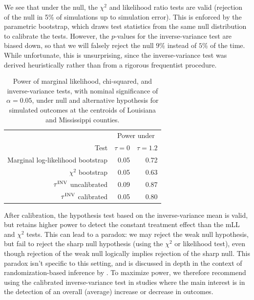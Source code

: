 	We see that under the null, the \(\chi^2\) and likelihood ratio tests are valid (rejection of the null in 5\% of simulations up to simulation error).
This is enforced by the parametric bootstrap, which draws test statistics from the same null distribution to calibrate the tests.
However, the \(p\)-values for the inverse-variance test are biased down, so that we will falsely reject the null \(9\%\) instead of \(5\%\) of the time.
While unfortunate, this is unsurprising, since the inverse-variance test was derived heuristically rather than from a rigorous frequentist procedure.

\begin{table}
    \centering
    \bgroup
    \def\arraystretch{1.1}%
    \centering
    \begin{tabular}{rrr}
        \hline
        & \multicolumn{2}{c}{Power under} \\
        Test & \(\tau=0\) & \(\tau=1.2\) \\
        \hline
	    Marginal log-likelihood bootstrap & 0.05 & 0.72 \\
	    \(\chi^2\) bootstrap & 0.05 & 0.63 \\
	    \(\tau^{\mathrm{INV}}\) uncalibrated & 0.09 & 0.87 \\
	    \(\tau^{\mathrm{INV}}\) calibrated & 0.05 & 0.80 \\
        \hline
    \end{tabular}
    \egroup
    \caption{
		Power of marginal likelihood, chi-squared, and inverse-variance tests, with nominal significance of \(\alpha=0.05\), under null and alternative hypothesis for simulated outcomes at the centroids of Louisiana and Mississippi counties.
    	\label{table:power}
	}
\end{table}

	After calibration, the hypothesis test based on the inverse-variance mean is valid, but retains higher power to detect the constant treatment effect than the mLL and \(\chi^2\) tests.
This can lead to a paradox: we may reject the weak null hypothesis, but fail to reject the sharp null hypothesis (using the \(\chi^2\) or likelihood test), even though rejection of the weak null logically implies rejection of the sharp null.
This paradox isn't specific to this setting, and is discussed in depth in the context of randomization-based inference by \cite{Ding:2014sf}.
To maximize power, we therefore recommend using the calibrated inverse-variance test in studies where the main interest is in the detection of an overall (average) increase or decrease in outcomes.

